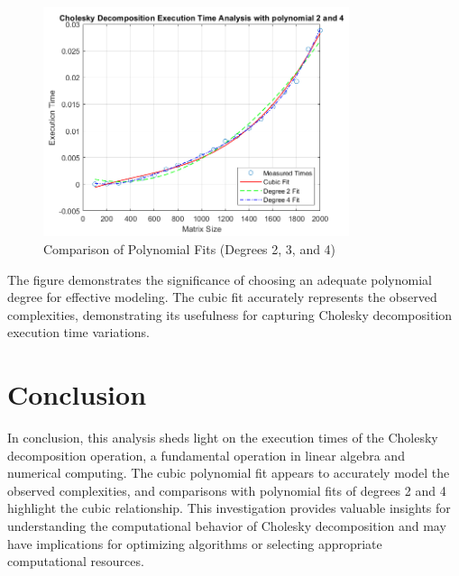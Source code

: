 \begin{figure}[ht]
    \centering
    \includegraphics[width=0.8\textwidth]{Chapters/Time Analysis with poly 2,4.png}
    \caption{Comparison of Polynomial Fits (Degrees 2, 3, and 4)}
    \label{fig:degree_comparison}
\end{figure}
The figure demonstrates the significance of choosing an adequate polynomial degree for effective modeling. The cubic fit accurately represents the observed complexities, demonstrating its usefulness for capturing Cholesky decomposition execution time variations.
\section*{Conclusion}
In conclusion, this analysis sheds light on the execution times of the Cholesky decomposition operation, a fundamental operation in linear algebra and numerical computing. The cubic polynomial fit appears to accurately model the observed complexities, and comparisons with polynomial fits of degrees 2 and 4 highlight the cubic relationship. This investigation provides valuable insights for understanding the computational behavior of Cholesky decomposition and may have implications for optimizing algorithms or selecting appropriate computational resources.



